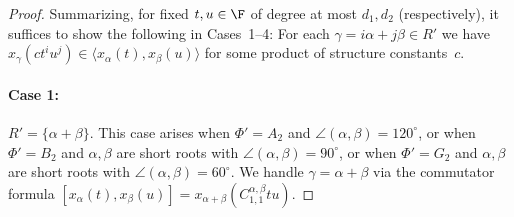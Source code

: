 \documentclass[11pt]{article}
\begin{document}
\begin{proof}
    Summarizing, for fixed $t, u \in \F$ of degree at most $d_1, d_2$ (respectively), it suffices to show the following in Cases~1--4: For each  $\gamma = i\alpha + j\beta \in R'$ we have $x_\gamma(c t^iu^j) \in \langle x_{\alpha}(t), x_{\beta}(u) \rangle$ for some product of structure constants~$c$.
    
    \paragraph{Case 1:} $R' = \{\alpha+\beta\}$. This case arises when $\Phi' = A_2$ and $\angle(\alpha,\beta) = 120^\circ$, or when $\Phi' = B_2$ and $\alpha,\beta$ are short roots with $\angle(\alpha,\beta) = 90^\circ$, or when $\Phi' = G_2$ and $\alpha,\beta$ are short roots with $\angle(\alpha,\beta) = 60^\circ$.  We handle $\gamma = \alpha + \beta$ via the commutator formula
    $
        [x_\alpha(t),x_\beta(u)] = x_{\alpha+\beta}(C_{1,1}^{\alpha,\beta}tu).
    $
    

\end{proof}
\end{document}
